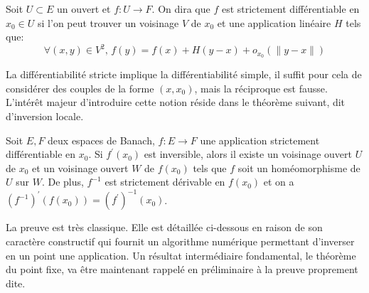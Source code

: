 


\begin{fdefn}\label{def:strict_diff}
Soit $U \subset E$ un ouvert et $f \colon U \to F$. On dira que $f$ est strictement différentiable en $x_0 \in U$ si l'on peut trouver
 un voisinage $V$ de $x_0$ et une application linéaire $H$ tels que:
\[
\forall (x,y) \in V^2, \, f(y) = f(x) + H(y-x) + o_{x_0}\left(\|y-x\|\right)
\]
\end{fdefn}

La différentiabilité stricte implique la différentiabilité simple, il suffit pour cela de considérer des couples de la forme $(x,x_0)$,
 mais la réciproque est fausse. L'intérêt majeur d'introduire cette notion réside dans le théorème suivant, dit d'inversion locale.

\begin{fthm}
Soit $E,F$ deux espaces de Banach, $f \colon E \to F$ une application strictement différentiable en $x_0$. 
Si $f^\prime(x_0)$ est inversible, alors il existe un voisinage ouvert $U$ de $x_0$ et un voisinage ouvert $W$ de $f(x_0)$ 
tels que $f$ soit un homéomorphisme de $U$ sur $W$. De plus, $f^{-1}$ est strictement dérivable en $f(x_0)$ et on 
a $\left( f^{-1} \right)^\prime(f(x_0)) = \left(f^{\prime}\right)^{-1}(x_0)$.
\end{fthm}
La preuve est très classique. Elle est détaillée ci-dessous en raison de son caractère constructif qui fournit un algorithme numérique permettant d'inverser en un point une application. Un résultat intermédiaire fondamental, le théorème du point fixe, va être maintenant rappelé en préliminaire à la preuve proprement dite.

